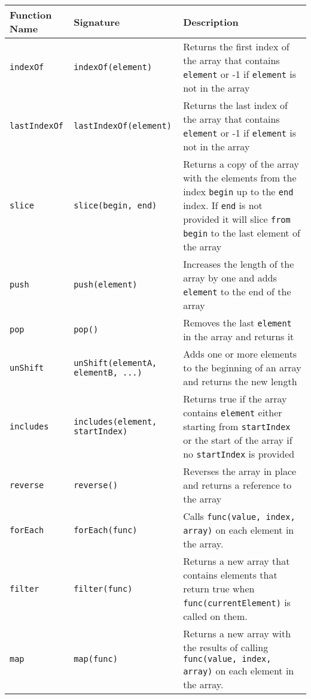 \documentclass[]{final_report}
\begin{document}
\begin{table}[t]
\centering
\begin{tabular}{|p{2cm}|p{4.2cm}|p{9cm}|}
\hline
Function Name & Signature & Description \\ \hline
\lstinline|indexOf| & {\lstinline|indexOf(element)|} & Returns the first index of the array that contains {\lstinline|element|} or -1 if {\lstinline|element|} is not in the array \\ \hline
\lstinline|lastIndexOf| & {\lstinline|lastIndexOf(element)|} & Returns the last index of the array that contains {\lstinline|element|} or -1 if {\lstinline|element|} is not in the array \\ \hline
\lstinline|slice| & {\lstinline|slice(begin, end)|} & Returns a copy of the array with the elements from the index {\lstinline|begin|} up to the {\lstinline|end|} index. If {\lstinline|end|} is not provided it will slice \lstinline|from| {\lstinline|begin|} to the last element of the array \\ \hline
\lstinline|push| & {\lstinline|push(element)|} & Increases the length of the array by one and adds {\lstinline|element|} to the end of the array \\ \hline
\lstinline|pop| & {\lstinline|pop()|} & Removes the last {\lstinline|element|} in the array and returns it \\ \hline
\lstinline|unShift| & {\lstinline|unShift(elementA, elementB, ...)|} & Adds one or more elements to the beginning of an array and returns the new length \\ \hline
\lstinline|includes| & {\lstinline|includes(element, startIndex)|} & Returns true if the array contains {\lstinline|element|} either starting from {\lstinline|startIndex|} or the start of the array if no {\lstinline|startIndex|} is provided \\ \hline
\lstinline|reverse| & {\lstinline|reverse()|} & Reverses the array in place and returns a reference to the array \\ \hline
\lstinline|forEach| & {\lstinline|forEach(func)|} & Calls {\lstinline|func(value, index, array)|} on each element in the array. \\ \hline
\lstinline|filter| & {\lstinline|filter(func)|} & Returns a new array that contains elements that return true when {\lstinline|func(currentElement)|} is called on them. \\ \hline
\lstinline|map| & {\lstinline|map(func)|} & Returns a new array with the results of calling {\lstinline|func(value, index, array)|} on each element in the array. \\ \hline

\end{tabular}
\end{table}
\end{document}
